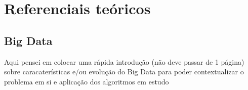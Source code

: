 \part{Referenciais teóricos}

\chapter{Big Data}
\begin{mdframed}[backgroundcolor=blue!20] 
        Aqui pensei em colocar uma rápida introdução (não deve passar de 1 página) sobre caracaterísticas e/ou evolução do Big Data para poder contextualizar o problema em si e aplicação dos algoritmos em estudo
\end{mdframed}

\begin{comment}
O Big Data não representa apenas uma simples combinação de tecnologias.

Big Data possui três características intrínsicas: volume, velocidade e variedade.
\end{comment}





